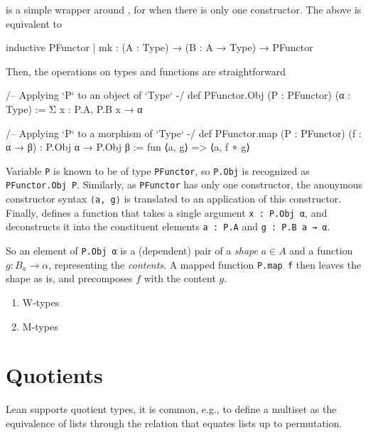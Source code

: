 \documentclass[titlepage]{report}
\newenvironment{remark}{%
\begin{framed}
\begin{trivlist}
    \item[\hskip \labelsep {\bfseries Remark:}]}%
{%
\end{trivlist}%
\end{framed}
}
\newenvironment{todo}{\begin{shaded}\begin{trivlist}                         
    \item[\hskip \labelsep {\bfseries Todo:}]}{\end{trivlist}\end{shaded}}
\newcommand\inductive{\lean{inductive}}
\begin{document}
\begin{remark}
     is a simple wrapper around \inductive, for when there is only one constructor.
    The above is equivalent to
    \begin{leancode}
        inductive PFunctor 
        | mk : (A : Type) → (B : A → Type) → PFunctor
    \end{leancode}
\end{remark}

Then, the operations on types and functions are straightforward
\begin{leancode}
    /-- Applying `P` to an object of `Type` -/
    def PFunctor.Obj (P : PFunctor) (α : Type)
        := Σ x : P.A, P.B x → α

    /-- Applying `P` to a morphism of `Type` -/
    def PFunctor.map (P : PFunctor) (f : α → β) : P.Obj α → P.Obj β 
        := fun ⟨a, g⟩ => ⟨a, f ∘ g⟩
\end{leancode}

\begin{remark}
    Variable \texttt{P} is known to be of type \texttt{PFunctor}, so \texttt{P.Obj} is recognized as \texttt{PFunctor.Obj P}. Similarly, as \texttt{PFunctor} has only one constructor, the anonymous constructor syntax \texttt{⟨a, g⟩} is translated to an application of this constructor.
    Finally,  defines a function that takes a single argument \texttt{x : P.Obj α}, and deconstructs it into the constituent elements \texttt{a : P.A} and \texttt{g : P.B a → α}.
\end{remark}

So an element of \texttt{P.Obj α} is a (dependent) pair of a \emph{shape} $a ∈ A$ and a function $g : B_a \rightarrow \alpha$, representing the \emph{contents}. A mapped function \texttt{P.map f} then leaves the shape as is, and precomposes $f$ with the content $g$.

\begin{todo}
    \begin{enumerate}
        \item W-types
        \item M-types
    \end{enumerate}
\end{todo}

\section{Quotients}
Lean supports quotient types, it is common, e.g., to define a multiset as the equivalence of lists through the relation that equates lists up to permutation.
\end{document}
